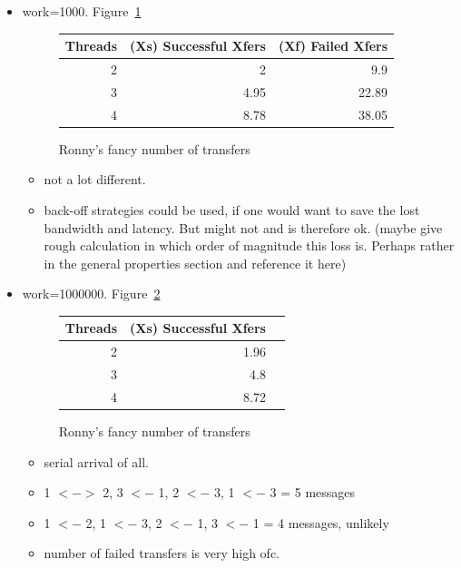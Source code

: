 \documentclass[a4paper, 10pt]{article}
\begin{document}
\begin{itemize}
\begin{itemize}
\begin{itemize}
				\end{itemize}
			\item work=1000. Figure~\ref{fig:df-transfers-1000}
				\begin{figure}[htbp]
					\centering
					\begin{tabular}{r | r r}
						Threads & (Xs) Successful Xfers & (Xf) Failed Xfers \\
						\hline
						2       & 2                     & 9.9               \\
						3       & 4.95                  & 22.89             \\
						4       & 8.78                  & 38.05             \\
					\end{tabular}
					\caption{Ronny's fancy number of transfers}
					\label{fig:df-transfers-1000}
				\end{figure}
				\begin{itemize}
					\item not a lot different.
					\item back-off strategies could be used, if one would want to save the lost bandwidth and latency. But might not and is therefore ok. (maybe give rough calculation in which order of magnitude this loss is. Perhaps rather in the general properties section and reference it here)
				\end{itemize}
			\item work=1000000. Figure~\ref{fig:df-transfers-1000000}
				\begin{figure}[htbp]
					\centering
					\begin{tabular}{r | r r}
						Threads & (Xs) Successful Xfers \\
						\hline
						2       & 1.96                  \\
						3       & 4.8                   \\
						4       & 8.72                  \\
					\end{tabular}
					\caption{Ronny's fancy number of transfers}
					\label{fig:df-transfers-1000000}
				\end{figure}
				\begin{itemize}
					\item serial arrival of all.
					\item 1 $<->$ 2, 3 $<-$ 1, 2 $<-$ 3, 1 $<-$ 3 = 5 messages
					\item 1 $<-$ 2, 1 $<-$ 3, 2 $<-$ 1, 3 $<-$ 1 = 4 messages, unlikely
					\item number of failed transfers is very high ofc.
				\end{itemize}
		\end{itemize}
\end{itemize}
\end{document}
